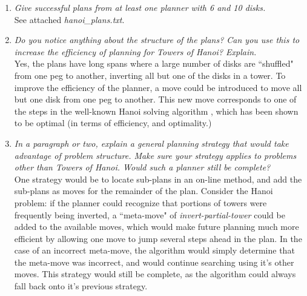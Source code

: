 \documentclass{article}
\begin{document}
\begin{enumerate}
\item{\textit{Give successful plans from at least one planner with 6 and 10 disks.\\}}
See attached \textit{hanoi\_plans.txt}.

\item{\textit{Do you notice anything about the structure of the plans? Can you use this to increase the efficiency of planning for Towers of Hanoi? Explain.\\}}
Yes, the plans have long spans where a large number of disks are ``shuffled" from one peg to another, inverting all but one of the disks in a tower.  To improve the efficiency of the planner, a move could be introduced to move all but one disk from one peg to another. This new move corresponds to one of the steps in the well-known Hanoi solving algorithm \cite{cutTheKnotHanoiAlgorithm}, which has been shown to be optimal (in terms of efficiency, and optimality.)

\item{\textit{In a paragraph or two, explain a general planning strategy that would take advantage of problem structure. Make sure your strategy applies to problems other than Towers of Hanoi. Would such a planner still be complete?\\}}
One strategy would be to locate sub-plans in an on-line method, and add the sub-plans as moves for the remainder of the plan.  Consider the Hanoi problem: if the planner could recognize that portions of towers were frequently being inverted, a ``meta-move" of \textit{invert-partial-tower} could be added to the available moves, which would make future planning much more efficient by allowing one move to jump several steps ahead in the plan.  In the case of an incorrect meta-move, the algorithm would simply determine that the meta-move was incorrect, and would continue searching using it's other moves.  This strategy would still be complete, as the algorithm could always fall back onto it's previous strategy.


\end{enumerate}



\end{document}
